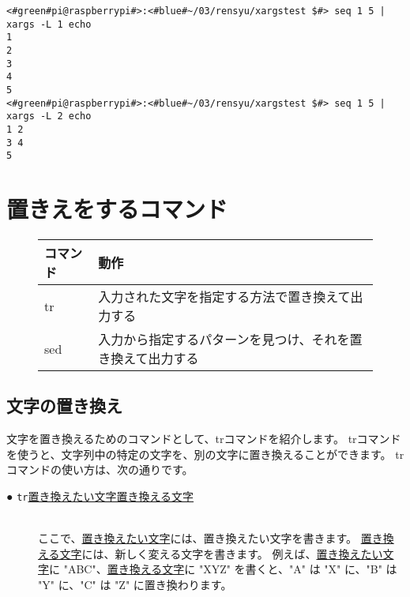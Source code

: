 \begin{lstlisting}[caption=xargsコマンドのオプションL]
<#green#pi@raspberrypi#>:<#blue#~/03/rensyu/xargstest $#> seq 1 5 | xargs -L 1 echo
1
2
3
4
5
<#green#pi@raspberrypi#>:<#blue#~/03/rensyu/xargstest $#> seq 1 5 | xargs -L 2 echo
1 2
3 4
5
\end{lstlisting}

\begin{tcolorbox}[title=\useOmetoi]
    \begin{enumerate}
    \end{enumerate}
\end{tcolorbox}
\newpage
\section{置きえをするコマンド}
\begin{figure}[h]
    \begin{tabular}{ll}
    コマンド & 動作                                                       \\ \hline
    tr       & 入力された文字を指定する方法で置き換えて出力する           \\
    sed      & 入力から指定するパターンを見つけ、それを置き換えて出力する \\ \hline
    \end{tabular}
\end{figure}

\subsection{文字の置き換え}
文字を置き換えるためのコマンドとして、trコマンドを紹介します。
trコマンドを使うと、文字列中の特定の文字を、別の文字に置き換えることができます。
trコマンドの使い方は、次の通りです。


\begin{description}
    \item[● \texttt{tr}\textvisiblespace \underline{置き換えたい文字}\textvisiblespace \underline{置き換える文字}]\mbox{}\\
    ここで、\underline{置き換えたい文字}には、置き換えたい文字を書きます。
    \underline{置き換える文字}には、新しく変える文字を書きます。
    例えば、\underline{置き換えたい文字}に "ABC"、\underline{置き換える文字}に "XYZ" を書くと、"A" は "X" に、"B" は "Y" に、"C" は "Z"
    に置き換わります。
\end{description}


